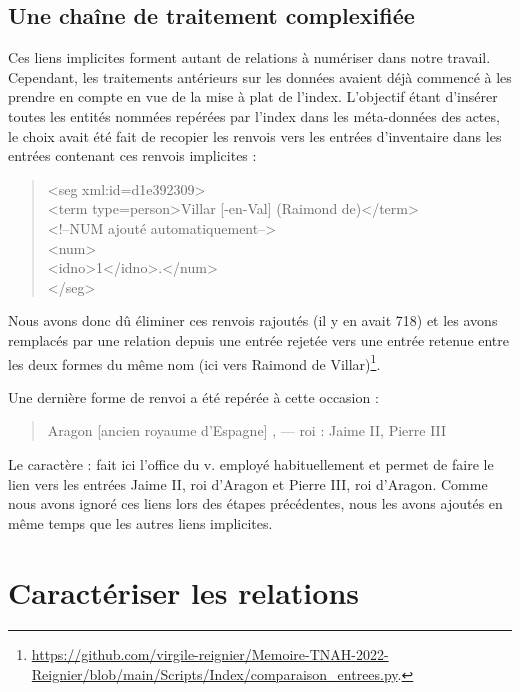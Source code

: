 \documentclass[a4paper,12pt,twoside]{book}
\begin{document}
	\subsection{Une chaîne de traitement complexifiée}
	
	Ces liens implicites forment autant de relations à numériser dans notre travail. Cependant, les traitements antérieurs sur les données avaient déjà commencé à les prendre en compte en vue de la mise à plat de l'index. L'objectif étant d'insérer toutes les entités nommées repérées par l'index dans les méta-données des actes, le choix avait été fait de recopier les renvois vers les entrées d'inventaire dans les entrées contenant ces renvois implicites :
	
	\begin{quotation}
               <seg xml:id=\textquotesingle d1e392309\textquotesingle >\\
				\indent\indent<term type=\textquotesingle person\textquotesingle >Villar [-en-Val] (Raimond de)</term>\\
				\indent\indent<!--NUM ajouté automatiquement-->\\
				\indent{}\\
				\indent\indent\indent<idno>1</idno>.</num>\\
				\indent</seg>
	\end{quotation}
	
	
	\noindent Nous avons donc dû éliminer ces renvois rajoutés (il y en avait 718) et les avons remplacés par une relation depuis une entrée rejetée vers une entrée retenue entre les deux formes du même nom (ici vers \og Raimond de Villar\fg{})\footnote{\url{https://github.com/virgile-reignier/Memoire-TNAH-2022-Reignier/blob/main/Scripts/Index/comparaison_entrees.py}.}.
	
	Une dernière forme de renvoi a été repérée à cette occasion :
	
	\begin{quotation}
		Aragon [ancien royaume d'Espagne] , — roi : Jaime II, Pierre III
	\end{quotation}
	
	\noindent Le caractère \og :\fg{} fait ici l'office du \og v.\fg{} employé habituellement et permet de faire le lien vers les entrées \og Jaime II, roi d'Aragon\fg{} et \og Pierre III, roi d'Aragon\fg{}. Comme nous avons ignoré ces liens lors des étapes précédentes, nous les avons ajoutés en même temps que les autres liens implicites.
	
	\section{Caractériser les relations}
	
\end{document}
